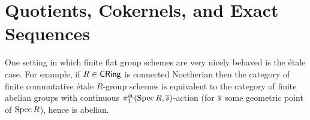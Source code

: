 \documentclass[11pt]{article}
\begin{document}
\begin{comment}
\begin{theorem}[Cartier]
Let $G=\Spec A$ be a finite (flat) $k$-group scheme for $k$ a field of characteristic $0$.\footnote{Flatness appears in parentheses here since every scheme over a field is flat.} Then, $G$ is \'{e}tale.\footnote{A similar theorem of Cartier-Oort says that an affine finite type $k$-group scheme for $k$ a field of characteristic $0$ is automatically reduced hence smooth by generic smoothness and homogeneity.}
\end{theorem}

\begin{proof}
The key is to show that $\Omega_{A/k}^1=0$. Let $I:=\ker(\eps_A: A\to k)$ be the augmentation ideal, which induces a splitting $A=k\oplus I$ and thus an identification $\Omega_{A/k}^1\iso A\tensor_kI/I^2$. Let $J:=\bigcap_{n\geq0}I^n$, which is nilpotent since $A$ is finite over the Artinian $k$. In his notes, Gyujin Oh argues that $A/J$ appears as a direct factor of $A$ and, in turn, $\Omega_{(A/J)/k}^1$ appears as a direct factor of $\Omega_{A/k}^1$. Let $x_1,\ldots,x_n$ be a $k$-basis for $I/I^2$. Then, $\Omega_{A/k}^1\iso Ax_1\oplus\cdots\oplus Ax_n$ and, in turn, $\Omega_{(A/J)/k}^1\iso(A/J)x_1\oplus\cdots\oplus(A/J)x_n$. At the same time, $A/J$ is some quotient of a polynomial ring over $k$ in $n$ generators and so $\Omega_{(A/J)/k}^1$ is a quotient of $(A/J)x_1\oplus\cdots\oplus(A/J)x_n$ by relations corresponding to the differentials of some polynomials. These differentials must then vanish, forcing the polynomials themselves to vanish (since $k$ has characteristic $0$) and giving that $A/J$ is a free polynomial algebra over $k$ in $n$ generators. Since $A/J$ is finite over $k$, this forces $n=0$ and so $I/I^2=0$. Hence, $\Omega_{A/k}^1=0$.
\end{proof}
\end{comment}

\section{Quotients, Cokernels, and Exact Sequences}
One setting in which finite flat group schemes are very nicely behaved is the \'{e}tale case. For example, if $R\in\operatorname{\mathsf{CRing}}$ is connected Noetherian then the category of finite commutative \'{e}tale $R$-group schemes is equivalent to the category of finite abelian groups with continuous $\pi_1^{\operatorname{\acute{e}t}}(\operatorname{Spec} R,\overline{s})$-action (for $\overline{s}$ some geometric point of $\operatorname{Spec} R$), hence is abelian. 
\end{document}
